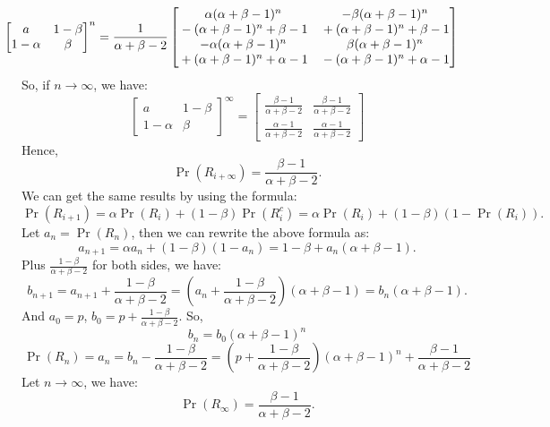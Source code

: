 \documentclass[14pt]{elegantbook}
\begin{document}
\begin{solution}
\begin{enumerate}[(a)]
\begin{align*}
                \hspace{-25pt}\begin{bmatrix}
                    a&1-\beta\\
                    1-\alpha&\beta
                \end{bmatrix}^n=\frac{1}{\alpha + \beta - 2}\begin{bmatrix}
                    \alpha (\alpha + \beta - 1)^n  & -\beta (\alpha + \beta - 1)^n  \\{}- (\alpha + \beta - 1)^n + \beta - 1 &{}+ (\alpha + \beta - 1)^n + \beta - 1\\
                    -\alpha (\alpha + \beta - 1)^n  &{} \beta (\alpha + \beta - 1)^n  \\{}+ (\alpha + \beta - 1)^n + \alpha - 1 &{}- (\alpha + \beta - 1)^n + \alpha - 1
                \end{bmatrix}
            \end{align*}
            So, if $n\to\infty$, we have:
            \[\begin{bmatrix}
                a&1-\beta\\
                1-\alpha&\beta
            \end{bmatrix}^\infty=\begin{bmatrix}
                \frac{\beta-1}{\alpha+\beta-2}&\frac{\beta-1}{\alpha+\beta-2}\\
                \frac{\alpha-1}{\alpha+\beta-2}&\frac{\alpha-1}{\alpha+\beta-2}
            \end{bmatrix}\]
            Hence, \[
                \Pr(R_{i+\infty})=\frac{\beta-1}{\alpha+\beta-2}. 
            \]
            We can get the same results by using the formula:
            \[\Pr(R_{i+1})=\alpha \Pr(R_{i})+(1-\beta)\Pr(R_{i}^c)=\alpha \Pr(R_{i})+(1-\beta)(1-\Pr(R_{i})). \]
            Let $a_{n}=\Pr(R_{n})$, then we can rewrite the above formula as:
            \[a_{n+1}=\alpha a_n+(1-\beta)(1-a_n)=1-\beta+a_n(\alpha+\beta-1). \]
            Plus $\frac{1-\beta}{\alpha+\beta-2}$ for both sides, we have:
            \[b_{n+1}=a_{n+1}+\frac{1-\beta}{\alpha+\beta-2}=\left(a_n+\frac{1-\beta}{\alpha+\beta-2}\right)(\alpha+\beta-1)=b_n(\alpha+\beta-1). \]
            And $a_0=p$, $b_0=p+\frac{1-\beta}{\alpha+\beta-2}$. So, 
            \[b_n=b_0(\alpha+\beta-1)^n\]
            \[\Pr(R_{n})=a_n=b_n-\frac{1-\beta}{\alpha+\beta-2}=\left(p+\frac{1-\beta}{\alpha+\beta-2}\right)(\alpha+\beta-1)^n+\frac{\beta-1}{\alpha+\beta-2}\]
            Let $n\to\infty$, we have:
            \[\Pr(R_\infty)=\frac{\beta-1}{\alpha+\beta-2}. \]
        \end{enumerate}
    \end{solution}
    
\end{document}
